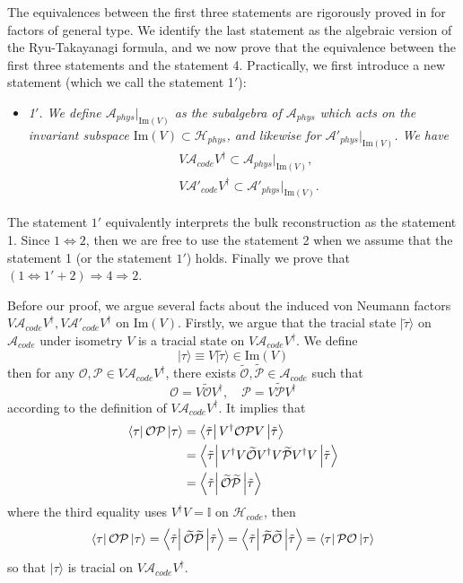 \documentclass[a4paper,11pt]{article}
\newcommand{\ket}[1]{| #1 \rangle } %
\newcommand{\diracprod}[3]{\left\langle  #1 \vphantom{#2#3} \right|#2 \left| #3 \vphantom{#1#2} \right\rangle } %
\renewcommand{\=}[1]{\stackrel{#1}{=}} %
\newcommand{\im}{\text{Im}}
\def\A{\mathcal{A}}
\def\O{\mathcal{O}}
\def\P{\mathcal{P}}
\def\H{\mathcal{H}}
\begin{document}
The equivalences between the first three statements are rigorously proved in \cite{Kang:2018xqy} for factors of general type. We identify the last statement as the algebraic version of the Ryu-Takayanagi formula, and we now prove that the equivalence between the first three statements and the statement 4. Practically, we first introduce a new statement (which we call the statement 1$'$):
\begin{itemize}
	\item \textit{1$'$. We define $\A_{phys}|_{\im(V)}$ as the subalgebra of $\A_{phys}$ which acts on the invariant subspace $\im(V)\subset \H_{phys}$, and likewise for $\A'_{phys}|_{\im(V)}$. We have
		\begin{equation}
			\begin{aligned}
				&V\A_{code}V^\dagger\subset \A_{phys}|_{\im(V)},\\ &V\A'_{code}V^\dagger\subset \A'_{phys}|_{\im(V)}.
			\end{aligned}
	\end{equation}}
\end{itemize}
The statement $1'$ equivalently interprets the bulk reconstruction as the statement 1. Since $1\Leftrightarrow2$, then we are free to use the statement 2 when we assume that the statement 1 (or the statement $1'$) holds. Finally we prove that $(1\Leftrightarrow1'+ 2)\Rightarrow4\Rightarrow2$.



Before our proof, we argue several facts about the induced von Neumann factors $V\A_{code}V^\dagger,V\A'_{code}V^\dagger$ on $\im(V)$. Firstly, we argue that the tracial state $\ket{\tilde{\tau}}$ on $\A_{code}$ under isometry $V$ is a tracial state on $V\A_{code}V^\dagger$. We define
\begin{equation}
	\ket{\tau}\equiv V\ket{\tilde{\tau}}\in \im(V)
\end{equation} 
then for any $\O,\P\in V\A_{code}V^\dagger$, there exists $\widetilde{\O},\widetilde{\P}\in \A_{code}$ such that
\begin{equation}
	\O=V\widetilde{\O}V^\dagger,\quad \P=V\widetilde{\P}V^\dagger
\end{equation}
according to the definition of $V\A_{code}V^\dagger$. It implies that
\begin{equation}
	\begin{aligned}
		\diracprod{\tau}{\O\P}{\tau}&=\diracprod{\tilde{\tau}}{V^\dagger\O\P V}{\tilde{\tau}}\\
		&=\diracprod{\tilde{\tau}}{V^\dagger V\widetilde{\O}V^\dagger V\widetilde{\P}V^\dagger V}{\tilde{\tau}}\\
		&=\diracprod{\tilde{\tau}}{\widetilde{\O} \widetilde{\P}}{\tilde{\tau}}
	\end{aligned}
\end{equation}
where the third equality uses $V^\dagger V=\mathbb{I}$ on $\H_{code}$, then
\begin{equation}
	\diracprod{\tau}{\O\P}{\tau}=\diracprod{\tilde{\tau}}{\widetilde{\O} \widetilde{\P}}{\tilde{\tau}}=\diracprod{\tilde{\tau}}{\widetilde{\P}\widetilde{\O} }{\tilde{\tau}}=\diracprod{\tau}{\P\O}{\tau}
\end{equation}
so that $\ket{\tau}$ is tracial on $V\A_{code}V^\dagger$.
\end{document}
